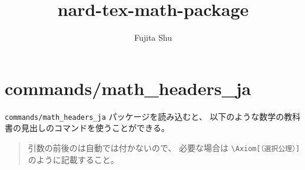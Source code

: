 \documentclass[oneside,10pt,a4paper]{jsarticle}
\title{nard-tex-math-package}
\author{Fujita Shu}
\begin{document}
  \maketitle

  \section{commands/math\_headers\_ja}

  \verb|commands/math_headers_ja| パッケージを読み込むと、%
  以下のような数学の教科書の見出しのコマンドを使うことができる。\\

  {\footnotesize
  \begin{quote}
    引数の前後のは自動では付かないので、%
    必要な場合は \verb|\Axiom[（選択公理）]| のように記載すること。
  \end{quote}
  }
\end{document}
